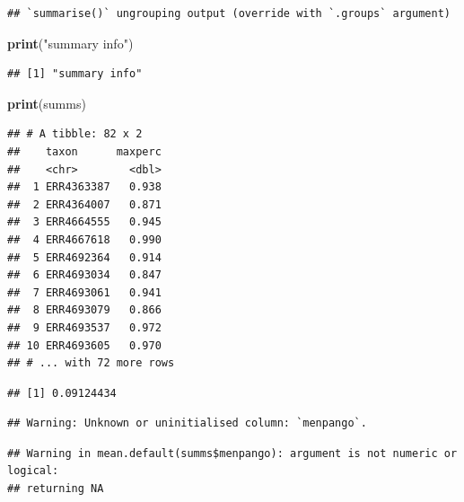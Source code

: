 \documentclass[
]{article}
\newenvironment{Shaded}{\begin{snugshade}}{\end{snugshade}}
\newcommand{\DecValTok}[1]{\textcolor[rgb]{0.00,0.00,0.81}{#1}}
\newcommand{\KeywordTok}[1]{\textcolor[rgb]{0.13,0.29,0.53}{\textbf{#1}}}
\newcommand{\NormalTok}[1]{#1}
\newcommand{\OperatorTok}[1]{\textcolor[rgb]{0.81,0.36,0.00}{\textbf{#1}}}
\newcommand{\StringTok}[1]{\textcolor[rgb]{0.31,0.60,0.02}{#1}}
\begin{document}
\begin{verbatim}
## `summarise()` ungrouping output (override with `.groups` argument)
\end{verbatim}

\begin{Shaded}
\begin{Highlighting}[]
\KeywordTok{print}\NormalTok{(}\StringTok{"summary info"}\NormalTok{)}
\end{Highlighting}
\end{Shaded}

\begin{verbatim}
## [1] "summary info"
\end{verbatim}

\begin{Shaded}
\begin{Highlighting}[]
\KeywordTok{print}\NormalTok{(summs)}
\end{Highlighting}
\end{Shaded}

\begin{verbatim}
## # A tibble: 82 x 2
##    taxon      maxperc
##    <chr>        <dbl>
##  1 ERR4363387   0.938
##  2 ERR4364007   0.871
##  3 ERR4664555   0.945
##  4 ERR4667618   0.990
##  5 ERR4692364   0.914
##  6 ERR4693034   0.847
##  7 ERR4693061   0.941
##  8 ERR4693079   0.866
##  9 ERR4693537   0.972
## 10 ERR4693605   0.970
## # ... with 72 more rows
\end{verbatim}

\begin{Shaded}
\end{Shaded}

\begin{verbatim}
## [1] 0.09124434
\end{verbatim}

\begin{verbatim}
## Warning: Unknown or uninitialised column: `menpango`.
\end{verbatim}

\begin{verbatim}
## Warning in mean.default(summs$menpango): argument is not numeric or logical:
## returning NA
\end{verbatim}
\end{document}

